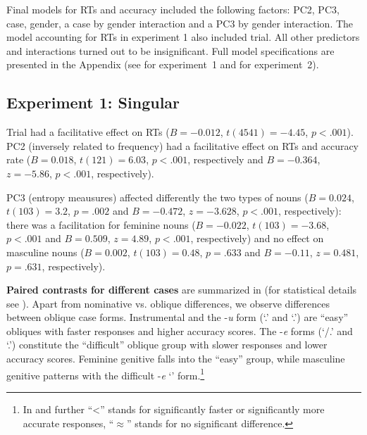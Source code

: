\documentclass[output=paper, modfonts,newtxmath,hidelinks]{langscibook}
\begin{document}
Final models for RTs and accuracy included the following factors: PC2, PC3, case, gender, a case by gender interaction and a PC3 by gender interaction. The model accounting for RTs in experiment 1 also included trial. All other predictors and interactions turned out to be insignificant. Full model specifications are presented in the Appendix (see  for experiment~1 and  for experiment~2).

\subsection{Experiment 1: Singular}

Trial had a facilitative effect on RTs ($B=-0.012$, $t(4541)=-4.45$, $p<.001$). PC2 (inversely related to frequency) had a facilitative effect on RTs and accuracy rate ($B= 0.018$, $t(121)= 6.03$, $p< .001$, respectively and $B= -0.364$, $z= -5.86$, $p< .001$, respectively). 

PC3 (entropy meausures) affected differently the two types of nouns ($B= 0.024$, $t(103)= 3.2$, $p= .002$ and $B= -0.472$, $z= -3.628$, $p< .001$, respectively):  there was a facilitation for feminine nouns ($B= -0.022$, $t(103)= -3.68$, $p< .001$ and $B= 0.509$, $z= 4.89$, $p< .001$, respectively) and no effect on masculine nouns ($B= 0.002$, $t(103)= 0.48$, $p= .633$ and $B= -0.11$, $z= 0.481$, $p= .631$, respectively).

\textbf{Paired contrasts for different cases} are summarized in  (for statistical details see ). Apart from nominative vs. oblique differences, we observe differences between oblique case forms. Instrumental and the -\textit{u} form (`\accc.\fem' and `\datt.\masc') are ``easy'' obliques with faster responses and higher accuracy scores. The -\textit{e} forms (`\datt/\locc.\fem' and `\locc.\masc') constitute the ``difficult'' oblique group with slower responses and lower accuracy scores. Feminine genitive falls into the ``easy'' group, while masculine genitive patterns with the difficult -\textit{e} `\locc' form.\footnote{In  and further ``<'' stands for significantly faster or significantly more accurate responses, ``$\approx$'' stands for no significant difference.}
\end{document}
